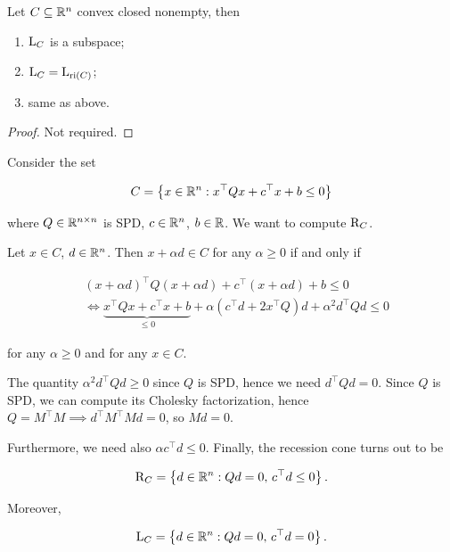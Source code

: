 \begin{proposition}[Properties of $\Lc{C}$]
    
    Let $C \subseteq {\mathbb{R}^n}$ convex closed nonempty, then 

    \begin{enumerate}
        \item $\Lc{C}$ is a subspace;
        \item $\mathrm{L}_{C} = \mathrm{L}_{\mathrm{ri}\left(C\right)}$;
        \item same as above.
    \end{enumerate}

\end{proposition}

\begin{proof}
    Not required.
\end{proof}

\begin{example}[Important!]
    
    Consider the set 

    \[ C = \left\{ x \in {\mathbb{R}^n} : x^\top Q x + c^\top x + b \le 0 \right\} \]

    where $Q \in \mathbb{R}^{n \times n}$ is SPD, $c \in {\mathbb{R}^n}$, $b \in \mathbb{R}$. We want to compute $\mathrm{R}_{C}$.

    Let $x \in C$, $d \in {\mathbb{R}^n}$. Then $x + \alpha d \in C$ for any $\alpha \ge 0$ if and only if 

    \begin{align*}
        &(x + \alpha d)^\top Q (x + \alpha d) + c^\top (x + \alpha d) + b \le 0 \\
        &\iff \underbrace{x^\top Q x + c^\top x + b}_{\le 0} + \alpha(c^\top d + 2x^\top Q)d + \alpha^2 d^\top Q d \le 0  
    \end{align*}

    for any $\alpha \ge 0$ and for any $x \in C$.

    The quantity $\alpha^2 d^\top Q d \ge 0$ since $Q$ is SPD, hence we need $d^\top Q d = 0$. Since $Q$ is SPD, we can compute its Cholesky factorization, hence $Q = M^\top M \implies d^\top M^\top M d = 0$, so $Md = 0$. 

    Furthermore, we need also $\alpha c^\top d \le 0$. Finally, the recession cone turns out to be 

    \[ \mathrm{R}_{C} = \left\{ d \in {\mathbb{R}^n} : Qd = 0,\, c^\top d \le 0 \right\}. \]

    Moreover, 

    \[ \mathrm{L}_{C} = \left\{ d \in {\mathbb{R}^n} : Qd = 0,\, c^\top d = 0 \right\}. \]

\end{example}